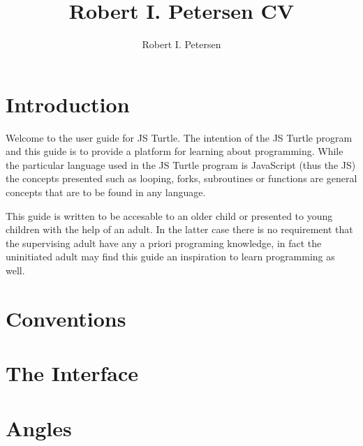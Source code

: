 \documentclass[letterpaper]{article}
\author{Robert I. Petersen}
\title{Robert I. Petersen CV}
\begin{document}
\section{Introduction}
Welcome to the user guide for JS Turtle.  The intention of
the JS Turtle program and this guide is to provide a platform for learning
about programming.  While the particular language used in the JS Turtle program
is JavaScript (thus the JS) the concepts presented such as looping, forks,
subroutines or functions are general concepts that are to be found in any
language.

This guide is written to be accesable to an older child or presented to young
children with the help of an adult.  In the latter case there is no requirement
that the supervising adult have any a priori programing knowledge, in fact the
uninitiated adult may find this guide an inspiration to learn programming as
well.

\section{Conventions}

\section{The Interface}

\section{Angles}
\end{document}
